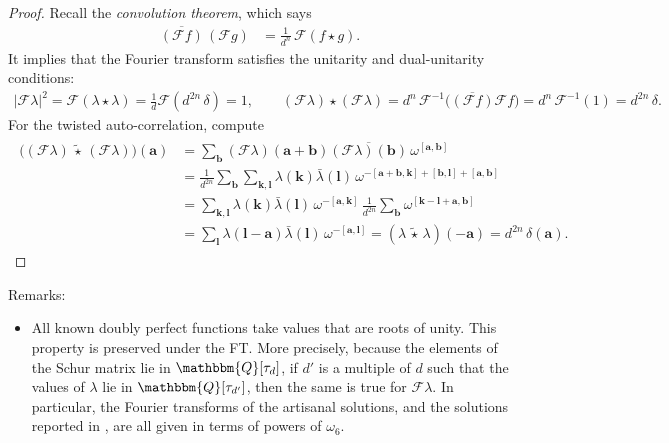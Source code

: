 \documentclass[aps,nofootinbib,floatfix,a4paper]{revtex4}
\newcommand{\1}{\mbox{$\mathbf{1}$}}
\def\QQ{\mathbbm{Q}}
\def\F{\mathcal{F}}
\newcommand{\twisted}{\,\tilde\star\,}
\renewcommand{\vec}{\mathbf}
\begin{document}
\begin{proof}
	Recall the \emph{convolution theorem}, which says
	\begin{align*}
		\overline{(\F f)}
		\,
		(\F g)
		&=
		\frac1{d^n}
		\,
		\F (f \star g). 
	\end{align*}
	It implies that the Fourier transform satisfies the unitarity and dual-unitarity conditions:
	\begin{align*}
		\big|\F \lambda\big|^2
		=
		\F(\lambda \star \lambda)
		=
		\frac1d
		\F(d^{2n}\, \delta)
		=
		1,
		\qquad
		(\F \lambda) \star (\F \lambda)
		=
		d^n
		\,
		\F^{-1}
		\big(
			\overline{(\F f)}
			\F f
		\big)
		=
		d^n
		\,
		\F^{-1} (1)
		= 
		d^{2n}\,\delta.
	\end{align*}
	For the twisted auto-correlation,  compute
	\begin{align}\label{eqn:twisted_symmetry}
		\begin{split}
			\big((\F \lambda) \twisted (\F \lambda)\big)(\vec a)
			&=
			\sum_{\vec b} 
			(\F \lambda)(\vec a + \vec b)
			\overline{(\F \lambda)(\vec b)} 
			\,
			\omega^{[\vec a,\vec b]}
			\\
			&=
			\frac1{d^{2n}}
			\sum_{\vec b} 
			\sum_{\vec k, \vec l}
			\lambda(\vec k)
			\bar\lambda(\vec l)
			\,
			\omega^{-[\vec a+\vec b,\vec k] + [\vec b, \vec l] +[\vec a, \vec b]}
			\\
			&=
			\sum_{\vec k, \vec l}
			\lambda(\vec k)
			\bar\lambda(\vec l)
			\,
			\omega^{-[\vec a,\vec k]}
			\,
			\frac1{d^{2n}}
			\sum_{\vec b} 
			\omega^{[\vec k - \vec l + \vec a, \vec b]}
			\\ %
			&=
			\sum_{\vec l}
			\lambda(\vec l - \vec a)
			\bar\lambda(\vec l)
			\,
			\omega^{-[\vec a,\vec l]}
			=
			(\lambda \twisted \lambda)(-\vec a) = d^{2n}\,\delta(\vec a).
		\end{split}
	\end{align}
\end{proof}

Remarks:
\begin{itemize}
	\item
		All known doubly perfect functions take values that are roots of unity.
		This property is preserved under the FT.
		More precisely, 
		because the elements of the Schur matrix lie in $\QQ[\tau_d]$, 
		if $d'$ is a multiple of $d$ such that the values of $\lambda$ lie in $\QQ[\tau_{d'}]$, 
		then the same is true for $\F \lambda$.
		In particular, the Fourier transforms of the artisanal solutions, and the solutions reported in \cite{Rather2024Construction}, are all given in terms of powers of $\omega_6$.
\end{itemize}
\end{document}
